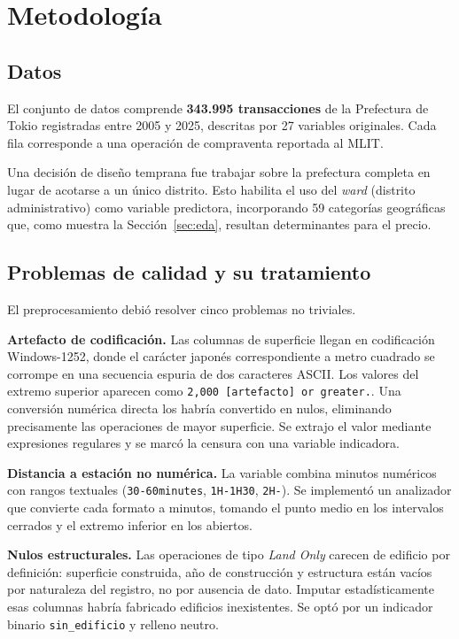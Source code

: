 \documentclass[conference]{IEEEtran}
\begin{document}
\section{Metodología}

\subsection{Datos}

El conjunto de datos comprende \textbf{343.995 transacciones} de la Prefectura de Tokio
registradas entre 2005 y 2025, descritas por 27 variables originales. Cada fila corresponde a
una operación de compraventa reportada al MLIT.

Una decisión de diseño temprana fue trabajar sobre la prefectura completa en lugar de acotarse
a un único distrito. Esto habilita el uso del \textit{ward} (distrito administrativo) como
variable predictora, incorporando 59 categorías geográficas que, como muestra la
Sección~\ref{sec:eda}, resultan determinantes para el precio.

\subsection{Problemas de calidad y su tratamiento}

El preprocesamiento debió resolver cinco problemas no triviales.

\textbf{Artefacto de codificación.} Las columnas de superficie llegan en codificación
Windows-1252, donde el carácter japonés correspondiente a metro cuadrado se corrompe en una
secuencia espuria de dos caracteres ASCII. Los valores del extremo superior aparecen como
\texttt{2,000 [artefacto] or greater.}. Una conversión numérica directa los habría convertido en
nulos, eliminando precisamente las operaciones de mayor superficie. Se extrajo el valor
mediante expresiones regulares y se marcó la censura con una variable indicadora.

\textbf{Distancia a estación no numérica.} La variable combina minutos numéricos con rangos
textuales (\texttt{30-60minutes}, \texttt{1H-1H30}, \texttt{2H-}). Se implementó un
analizador que convierte cada formato a minutos, tomando el punto medio en los intervalos
cerrados y el extremo inferior en los abiertos.

\textbf{Nulos estructurales.} Las operaciones de tipo \textit{Land Only} carecen de edificio
por definición: superficie construida, año de construcción y estructura están vacíos por
naturaleza del registro, no por ausencia de dato. Imputar estadísticamente esas columnas
habría fabricado edificios inexistentes. Se optó por un indicador binario
\texttt{sin\_edificio} y relleno neutro.
\end{document}
